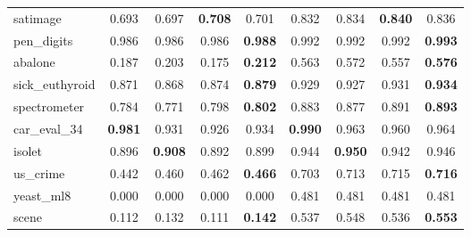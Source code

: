 \begin{figure}[ht]
\begin{tabular}{p{22mm}|*4{p{14mm}}|*4{p{14mm}}}
        satimage&\multicolumn{1}{c}{0.693}&\multicolumn{1}{c}{0.697}&\multicolumn{1}{c}{\textbf{0.708}}&\multicolumn{1}{c|}{0.701}&\multicolumn{1}{c}{0.832}&\multicolumn{1}{c}{0.834}&\multicolumn{1}{c}{\textbf{0.840}}&\multicolumn{1}{c}{0.836}\\
        pen\_digits&\multicolumn{1}{c}{0.986}&\multicolumn{1}{c}{0.986}&\multicolumn{1}{c}{0.986}&\multicolumn{1}{c|}{\textbf{0.988}}&\multicolumn{1}{c}{0.992}&\multicolumn{1}{c}{0.992}&\multicolumn{1}{c}{0.992}&\multicolumn{1}{c}{\textbf{0.993}}\\
        abalone&\multicolumn{1}{c}{0.187}&\multicolumn{1}{c}{0.203}&\multicolumn{1}{c}{0.175}&\multicolumn{1}{c|}{\textbf{0.212}}&\multicolumn{1}{c}{0.563}&\multicolumn{1}{c}{0.572}&\multicolumn{1}{c}{0.557}&\multicolumn{1}{c}{\textbf{0.576}}\\
        sick\_euthyroid&\multicolumn{1}{c}{0.871}&\multicolumn{1}{c}{0.868}&\multicolumn{1}{c}{0.874}&\multicolumn{1}{c|}{\textbf{0.879}}&\multicolumn{1}{c}{0.929}&\multicolumn{1}{c}{0.927}&\multicolumn{1}{c}{0.931}&\multicolumn{1}{c}{\textbf{0.934}}\\
        spectrometer&\multicolumn{1}{c}{0.784}&\multicolumn{1}{c}{0.771}&\multicolumn{1}{c}{0.798}&\multicolumn{1}{c|}{\textbf{0.802}}&\multicolumn{1}{c}{0.883}&\multicolumn{1}{c}{0.877}&\multicolumn{1}{c}{0.891}&\multicolumn{1}{c}{\textbf{0.893}}\\
        car\_eval\_34&\multicolumn{1}{c}{\textbf{0.981}}&\multicolumn{1}{c}{0.931}&\multicolumn{1}{c}{0.926}&\multicolumn{1}{c|}{0.934}&\multicolumn{1}{c}{\textbf{0.990}}&\multicolumn{1}{c}{0.963}&\multicolumn{1}{c}{0.960}&\multicolumn{1}{c}{0.964}\\
        isolet&\multicolumn{1}{c}{0.896}&\multicolumn{1}{c}{\textbf{0.908}}&\multicolumn{1}{c}{0.892}&\multicolumn{1}{c|}{0.899}&\multicolumn{1}{c}{0.944}&\multicolumn{1}{c}{\textbf{0.950}}&\multicolumn{1}{c}{0.942}&\multicolumn{1}{c}{0.946}\\
        us\_crime&\multicolumn{1}{c}{0.442}&\multicolumn{1}{c}{0.460}&\multicolumn{1}{c}{0.462}&\multicolumn{1}{c|}{\textbf{0.466}}&\multicolumn{1}{c}{0.703}&\multicolumn{1}{c}{0.713}&\multicolumn{1}{c}{0.715}&\multicolumn{1}{c}{\textbf{0.716}}\\
        yeast\_ml8&\multicolumn{1}{c}{0.000}&\multicolumn{1}{c}{0.000}&\multicolumn{1}{c}{0.000}&\multicolumn{1}{c|}{0.000}&\multicolumn{1}{c}{0.481}&\multicolumn{1}{c}{0.481}&\multicolumn{1}{c}{0.481}&\multicolumn{1}{c}{0.481}\\
        scene&\multicolumn{1}{c}{0.112}&\multicolumn{1}{c}{0.132}&\multicolumn{1}{c}{0.111}&\multicolumn{1}{c|}{\textbf{0.142}}&\multicolumn{1}{c}{0.537}&\multicolumn{1}{c}{0.548}&\multicolumn{1}{c}{0.536}&\multicolumn{1}{c}{\textbf{0.553}}\\

\end{tabular}
\end{figure}
